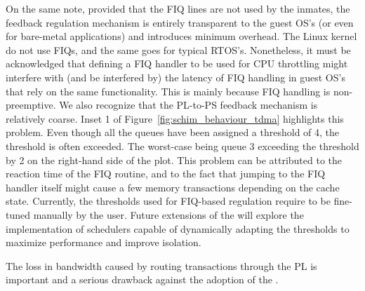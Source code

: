{  On the same note, provided that the FIQ lines are not used by the
  inmates, the feedback regulation mechanism is entirely transparent
  to the guest OS's (or even for bare-metal applications) and
  introduces minimum overhead. The Linux kernel do not use FIQs, and
  the same goes for typical RTOS's. Nonetheless, it must be
  acknowledged that defining a FIQ handler to be used for CPU
  throttling might interfere with (and be interfered by) the latency
  of FIQ handling in guest OS's that rely on the same
  functionality. This is mainly because FIQ handling is
  non-preemptive. We also recognize that the PL-to-PS feedback
  mechanism is relatively coarse. Inset 1 of
  Figure~\ref{fig:schim_behaviour_tdma} highlights this problem. Even
  though all the queues have been assigned a threshold of 4, the
  threshold is often exceeded.  The worst-case being queue 3 exceeding
  the threshold by 2 on the right-hand side of the plot. This problem
  can be attributed to the reaction time of the FIQ routine, and to
  the fact that jumping to the FIQ handler itself might cause a few
  memory transactions depending on the cache state. Currently, the
  thresholds used for FIQ-based regulation require to be fine-tuned
  manually by the user. Future extensions of the \schim will explore
  the implementation of schedulers capable of dynamically adapting the
  thresholds to maximize performance and improve isolation.

  The loss in bandwidth caused by routing transactions through the PL
  is important and a serious drawback against the adoption of the
  \schim.}
